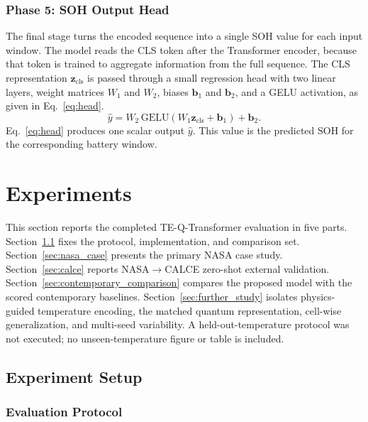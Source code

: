 \documentclass[a4paper,fleqn]{cas-sc}
\begin{document}
\subsubsection{Phase 5: SOH Output Head}
The final stage turns the encoded sequence into a single SOH value for each input window. The model reads the CLS token after the Transformer encoder, because that token is trained to aggregate information from the full sequence. The CLS representation $\mathbf{z}_{\mathrm{cls}}$ is passed through a small regression head with two linear layers, weight matrices $W_{1}$ and $W_{2}$, biases $\mathbf{b}_{1}$ and $\mathbf{b}_{2}$, and a GELU activation, as given in Eq.~\eqref{eq:head}.
\begin{equation}
\hat{y}
=
W_{2}\,\mathrm{GELU}(W_{1}\mathbf{z}_{\mathrm{cls}}+\mathbf{b}_{1})+\mathbf{b}_{2}.
\label{eq:head}
\end{equation}
Eq.~\eqref{eq:head} produces one scalar output $\hat{y}$. This value is the predicted SOH for the corresponding battery window.




\section{Experiments}\label{sec:experiments}\label{sec:results}

This section reports the completed TE-Q-Transformer evaluation in five parts. Section~\ref{sec:experiment_setup} fixes the protocol, implementation, and comparison set. Section~\ref{sec:nasa_case} presents the primary NASA case study. Section~\ref{sec:calce} reports NASA$\rightarrow$CALCE zero-shot external validation. Section~\ref{sec:contemporary_comparison} compares the proposed model with the scored contemporary baselines. Section~\ref{sec:further_study} isolates physics-guided temperature encoding, the matched quantum representation, cell-wise generalization, and multi-seed variability. A held-out-temperature protocol was not executed; no unseen-temperature figure or table is included.

\subsection{Experiment Setup}
\label{sec:experiment_setup}

\subsubsection{Evaluation Protocol}
\label{sec:evaluation_protocol}
\end{document}
